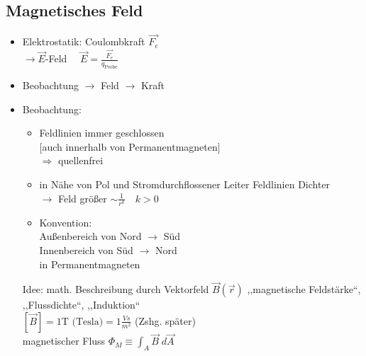 \documentclass[titlepage,12pt,a4paper,ngerman]{report}
\newcommand{\tx}[1]{\textrm{#1}}
\begin{document}
\subsection{Magnetisches Feld}
\begin{itemize}
	\item Elektrostatik: Coulombkraft $ \vec{F_e} $ \\
	$ \rightarrow \vec{E} $-Feld $ \quad \vec{E} = \frac{\vec{F_e}}{q_{\tx{Probe}}} $
	\item Beobachtung $ \rightarrow $ Feld $ \rightarrow $ Kraft
\end{itemize}
\begin{itemize}
	\item Beobachtung:
	\begin{itemize}
		\item Feldlinien immer geschlossen\\
		$[$auch innerhalb von Permanentmagneten$]$\\
		$ \Rightarrow $ quellenfrei
		\item in Nähe von Pol und Stromdurchflossener Leiter Feldlinien Dichter\\
		$ \rightarrow $ Feld größer $ \sim \frac{1}{r^k} \quad k> 0 $
		\item Konvention: \\
		Außenbereich von Nord $ \rightarrow $ Süd\\
		Innenbereich von Süd $ \rightarrow $ Nord\\
		in Permanentmagneten
	\end{itemize}
	Idee: math. Beschreibung durch Vektorfeld $ \vec{B}(\vec{r}) $ ,,magnetische Feldstärke``,\\ ,,Flussdichte``, ,,Induktion``\\
	$ [\vec{B}] = 1 \tx{T (Tesla)} = 1 \frac{Vs}{m^2} $ (Zshg. später)\\magnetischer Fluss $ \Phi_M \equiv \int_A \vec{B} \; d \vec{A} $
\end{itemize}


\end{document}
